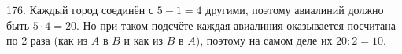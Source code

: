 176. Каждый город соединён с $5-1=4$ другими, поэтому авиалиний должно быть $5\cdot4=20.$ Но при таком подсчёте каждая авиалиния оказывается посчитана по 2 раза (как из $A$ в $B$ и как из $B$ в $A$), поэтому на самом деле их $20:2=10.$\\
